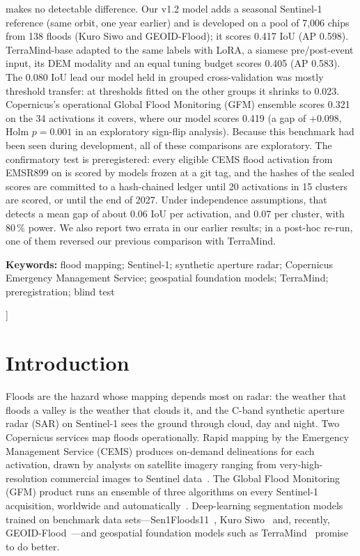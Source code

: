 \documentclass[10pt,twocolumn,a4paper]{article}
\newcommand{\pp}{\,\%}
\begin{document}
{\begin{center}
\begin{minipage}{0.9\textwidth}
makes no detectable difference. Our v1.2 model adds a seasonal Sentinel-1 reference (same orbit, one year earlier)
and is developed on a pool of 7,006 chips from 138 floods (Kuro Siwo and GEOID-Flood); it scores 0.417 IoU (AP
0.598).
TerraMind-base adapted to the same labels with LoRA, a siamese pre/post-event input, its DEM modality and an equal
tuning budget scores 0.405 (AP 0.583). The 0.080 IoU lead our model held in grouped cross-validation was mostly
threshold transfer: at thresholds fitted on the other groups it shrinks to 0.023. Copernicus's operational Global
Flood Monitoring (GFM) ensemble scores 0.321 on the 34 activations it covers, where our model scores 0.419 (a gap
of $+0.098$, Holm $p = 0.001$ in an exploratory sign-flip analysis). Because this benchmark had been seen during
development, all of these comparisons are exploratory. The confirmatory test is preregistered: every eligible CEMS
flood activation from EMSR899 on is scored by models frozen at a git tag, and the hashes of the sealed scores are
committed to a hash-chained ledger until 20 activations in 15 clusters are scored, or until the end of 2027. Under
independence assumptions, that detects a mean gap of about 0.06 IoU per activation, and 0.07 per cluster, with 80\pp{}
power. We also report two errata in our earlier results; in a post-hoc re-run, one of them reversed our previous
comparison with TerraMind.

\vspace{4pt}
\noindent\textbf{Keywords:} flood mapping; Sentinel-1; synthetic aperture radar; Copernicus Emergency Management
Service; geospatial foundation models; TerraMind; preregistration; blind test
\end{minipage}
\end{center}
\vspace{10pt}
}]

\section{Introduction}

Floods are the hazard whose mapping depends most on radar: the weather that floods a valley is the weather that
clouds it, and the C-band synthetic aperture radar (SAR) on Sentinel-1 sees the ground through cloud, day and night.
Two Copernicus services map floods operationally. Rapid mapping by the Emergency Management Service (CEMS) produces
on-demand delineations for each activation, drawn by analysts on satellite imagery ranging from very-high-resolution
commercial images to Sentinel data~\citep{cems2026rapidmapping}. The Global Flood Monitoring (GFM) product runs an ensemble of three algorithms
on every Sentinel-1 acquisition, worldwide and automatically~\citep{salamon2021gfm,krullikowski2023gfm}.
Deep-learning segmentation models trained on benchmark data sets---Sen1Floods11~\citep{bonafilia2020sen1floods11},
Kuro Siwo~\citep{bountos2024kurosiwo} and, recently, GEOID-Flood~\citep{chiriaco2026geoid}---and geospatial
foundation models such as TerraMind~\citep{jakubik2025terramind} promise to do better.
\end{document}
